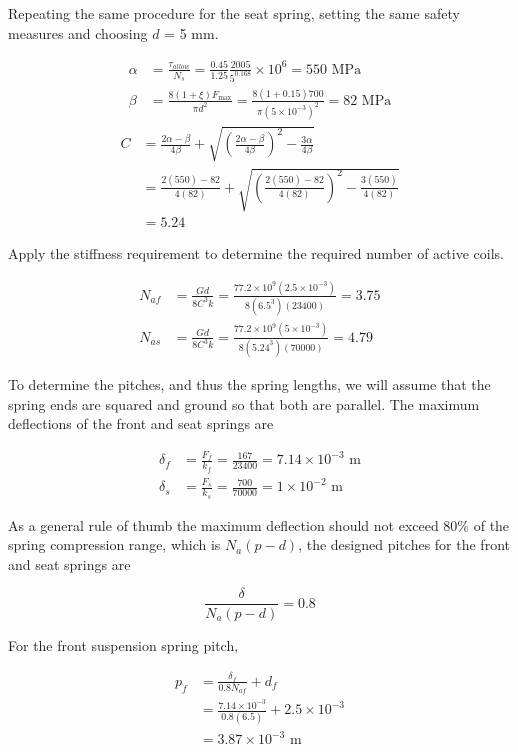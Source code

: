 \documentclass[a4paper,openany,12pt]{book}
\begin{document}
{{Repeating the same procedure for the seat spring, setting the same
safety measures and choosing \(d\) = 5 mm.

$$\begin{aligned}
    \alpha &= \frac{\tau_{allow}}{N_s} = \frac{0.45}{1.25}\frac{2005}{5^{0.168}} \times 10^6 = 550\text{ MPa} \\ 
    \beta &= \frac{8(1 + \xi )F_{\max}}{\pi d^2} = \frac{8(1 + 0.15)700}{\pi (5 \times 10^{-3})^2} = 82\text{ MPa}
  \end{aligned}$$ $$\begin{aligned}
    C &= \frac{2\alpha  - \beta}{4\beta} + \sqrt {\left( \frac{2\alpha  - \beta}{4\beta} \right)^2 - \frac{3\alpha}{4\beta}}  \\ 
      &= \frac{2(550) - 82}{4(82)} + \sqrt {\left( \frac{2(550) - 82}{4(82)} \right)^2 - \frac{3(550)}{4(82)}}  \\ 
      &= 5.24
  \end{aligned}$$

Apply the stiffness requirement to determine the required number of
active coils.

$$\begin{aligned}
    N_{af} &= \frac{Gd}{8C^3k} = \frac{77.2 \times 10^9(2.5 \times 10^{-3})}{8(6.5^3)(23400)} = 3.75 \\
    N_{as} &= \frac{Gd}{8C^3k} = \frac{77.2 \times 10^9(5 \times 10^{-3})}{8(5.24^3)(70000)} = 4.79
  \end{aligned}$$

To determine the pitches, and thus the spring lengths, we will assume
that the spring ends are squared and ground so that both are parallel.
The maximum deflections of the front and seat springs are

$$\begin{aligned}
    \delta_f &= \frac{F_f}{k_f} = \frac{167}{23400} = 7.14 \times 10^{-3} \text{ m} \\
    \delta_s &= \frac{F_s}{k_s} = \frac{700}{70000} = 1 \times 10^{-2}\text{ m}
  \end{aligned}$$

As a general rule of thumb the maximum deflection should not exceed 80\%
of the spring compression range, which is \(N_a(p - d)\), the designed
pitches for the front and seat springs are

$$\frac{\delta}{N_a(p - d)} = 0.8$$

For the front suspension spring pitch,

$$\begin{aligned}
    p_f &= \frac{\delta _f}{0.8N_{af}} + d_f \\ 
          &= \frac{7.14 \times 10^{-3}}{0.8(6.5)} + 2.5 \times 10^{-3} \\ 
          &= 3.87 \times 10^{-3} \text{ m}
  \end{aligned}$$

}}
\end{document}
